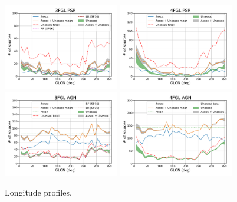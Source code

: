 \begin{figure}[h]
\center
\includegraphics[width=0.45\textwidth]{plots/lon_profile_PSR_3FGL.pdf}
\includegraphics[width=0.45\textwidth]{plots/lon_profile_PSR_4FGL.pdf} \\
\includegraphics[width=0.45\textwidth]{plots/lon_profile_AGN_3FGL.pdf}
\includegraphics[width=0.45\textwidth]{plots/lon_profile_AGN_4FGL.pdf}
\caption{Longitude profiles.}  
\label{fig:lon_profile}
\end{figure}


